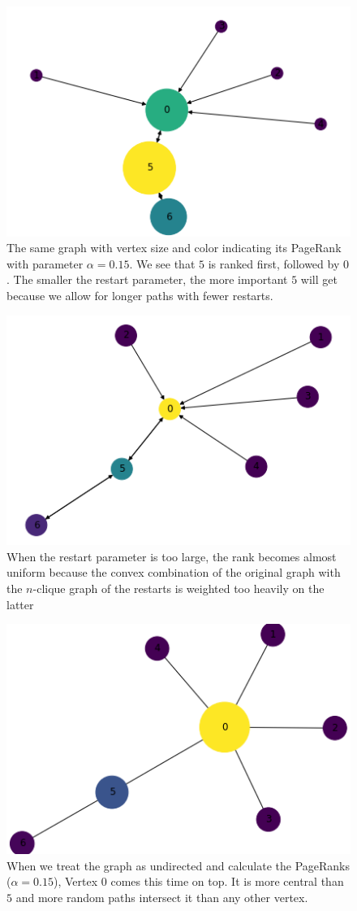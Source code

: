 \documentclass[a4paper,10pt]{article}
\theoremstyle{definition}
\theoremstyle{remark}
\theoremstyle{plain}
\begin{document}
\begin{figure}[!htb]
  \centering
    \includegraphics[width=0.55\linewidth]{directed_graph_example.png}
  \caption{The same graph with vertex size and color indicating its PageRank
  with parameter $\alpha=0.15$. We see that $5$ is ranked first, followed by
  $0$. The smaller the restart parameter, the more important $5$ will get
  because we allow for longer paths with fewer restarts.}
  \label{fig:weaklyconnectedpagedranked}
\end{figure}

\begin{figure}[!htb]
  \centering
    \includegraphics[width=0.55\linewidth]{directed_graph_example_tinyalpha.png}
  \caption{When the restart parameter is too large, the rank becomes almost
  uniform because the convex combination of the original graph with the
  $n$-clique graph of the restarts is weighted too heavily on the latter}
  \label{fig:weaklyconnectedpagedrankedbadly}
\end{figure}

\begin{figure}[!htb]
  \centering
    \includegraphics[width=0.55\linewidth]{undirected_graph_example.png}
  \caption{When we treat the graph as undirected and calculate the PageRanks
  ($\alpha=0.15$),
  Vertex $0$ comes this time on top. It is more central than $5$ and
  more random paths intersect it than any other vertex.}
  \label{fig:undirectedanked}
\end{figure}
\end{document}
